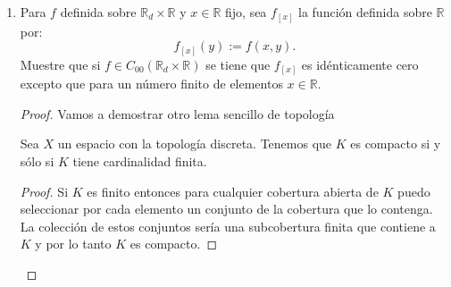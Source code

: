 \documentclass[letter,twoside,12pt]{article}
\numberwithin{equation}{section}
\begin{document}
\begin{enumerate}[label = (\textbf{\arabic*.})]
\begin{enumerate}[label = (\textbf{\roman*.})]
\begin{proof}
\begin{lemma} \label{le:rlocal}
El espacio $  \mathbb{R} $ es localmente compacto.
\end{lemma}
\begin{proof}
Tómese cualquier $x \in \mathbb{R} $. Sabemos que existe algún intervalo abierto $ (a,b) $ tal que $ x \in (a,b) $ y puesto que tenemos que $ [a,b] $ es compacto concluimos que $ [a,b] $ es una vecindad compacta de $ x $. Ver \cite[$ \mathsection $ 29, Ejemplo 1]{munkres}.
\end{proof}

\begin{lemma} \label{le:plocal}
Sean $X $ y $ Y$ dos espacio topológicos localmente compactos. Entonces tenemos que el espacio $ X \times Y $ con la topología producto es localmente compacto.
\end{lemma}
\begin{proof}
Tómese un punto cualquiera $ (x,y) $ en el producto. Puesto que $X$ y $Y$ son localmente compactos tenemos que existen conjuntos abiertos $U, V$ y conjuntos compactos $J, K $ tales que $ x \in U \subseteq J \subseteq X $ y $ y \in V \subseteq K \subseteq Y $. Puesto que el producto de compactos es compacto (ver \cite[Teorema 26.7]{munkres}) y el producto de abiertos es abierto (ver \cite[$ \mathsection $ 15, La topología producto de $X \times Y$]{munkres}), concluimos que
\begin{equation*}
(x,y) \in U \times V \subseteq J \times K
\end{equation*}
por lo que concluimos que el espacio es localmente compacto. \end{proof}

Por el \autoref{le:dlocal} y el \autoref{le:rlocal} tenemos que $ \mathbb{R}_d $ y $ \mathbb{R} $ son localmente compactos. Finalmente por el \autoref{le:plocal} concluimos que el producto entre ellos $ \mathbb{R}_d \times \mathbb{R} $ es localmente compacto.
\end{proof}

\item Para $ f $ definida sobre $ \mathbb{R}_d \times \mathbb{R} $ y $ x \in \mathbb{R} $ fijo, sea $ f_{[x]} $ la función definida sobre $ \mathbb{R} $ por:
$$ f_{[x]}(y):=f(x,y). $$
Muestre que si $ f \in C_{00}(\mathbb{R}_d \times \mathbb{R}) $ se tiene que $ f_{[x]} $ es idénticamente cero excepto que para un número finito de elementos $ x \in \mathbb{R} $.
\begin{proof}
Vamos a demostrar otro lema sencillo de topología
\begin{lemma}\label{le:dcompacto}
Sea $ X $ un espacio con la topología discreta. Tenemos que $K$ es compacto si y sólo si $ K $ tiene cardinalidad finita.
\end{lemma}
\begin{proof}
Si $K$ es finito entonces para cualquier cobertura abierta de $K$ puedo seleccionar por cada elemento un conjunto de la cobertura que lo contenga. La colección de estos conjuntos sería una subcobertura finita que contiene a $K$ y por lo tanto $K $ es compacto.


\end{proof}
\end{proof}
\end{enumerate}
\end{enumerate}
\end{document}
